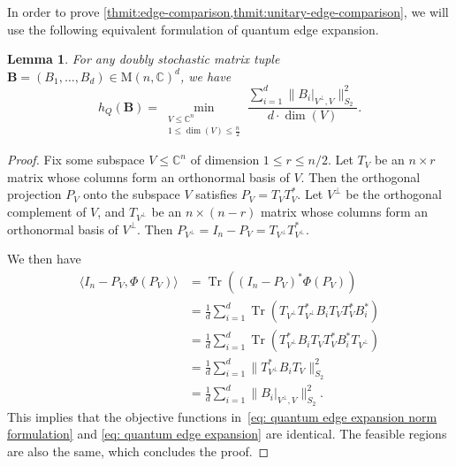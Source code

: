 \documentclass[11pt]{article}
\newtheorem{lemma}[theorem]{Lemma}
\theoremstyle{plain}
\numberwithin{equation}{section}
\theoremstyle{definition}
\newcommand{\bC}{\mathbb{C}}
\DeclareMathOperator{\trace}{Tr}
\newcommand{\norm}[1]{\lVert#1\rVert}
\newcommand{\M}{\mathrm{M}}
\newcommand{\tuple}[1]{\mathbf{#1}}
\newcommand{\vB}{\tuple{B}}
\begin{document}
In order to prove \cref{thmit:edge-comparison,thmit:unitary-edge-comparison}, we will use the following equivalent formulation of quantum edge expansion.
\begin{lemma}\label{lem: quantum edge expansion norm formulation}
  For any doubly stochastic matrix tuple $\vB=(B_1,\dots,B_d) \in \M(n,\bC)^d$, we have
  \begin{equation}\label{eq: quantum edge expansion norm formulation}
    h_Q(\vB)=\min_{\substack{V \leq \bC^n\\1\leq\dim(V)\leq\frac{n}{2}}}\frac{\sum_{i=1}^d\norm{B_i|_{V^\perp,V}}_{S_2}^2}{d\cdot\dim(V)}.
  \end{equation}
\end{lemma}
\begin{proof}
  Fix some subspace $V \leq \bC^n$ of dimension $1 \leq r \leq n/2$.
  Let $T_V$ be an $n\times r$ matrix whose columns form an 
  orthonormal basis of $V$. Then the orthogonal projection $P_V$ onto the subspace $V$ satisfies $P_V=T_V T^*_V$. 
    Let 
  $V^\perp$ be the orthogonal complement of $V$, and $T_{V^\perp}$ be an 
  $n\times (n-r)$ matrix whose columns form an orthonormal basis of $V^\perp$. Then 
  $P_{V^\perp}=I_n-P_V=T_{V^\perp}T_{V^\perp}^*$.
  
  We then have 
  \[
  \begin{split}
    \langle I_n-P_V,\Phi(P_V)\rangle&=\trace((I_n-P_V)^*\Phi(P_V))\\
    &=\frac 1d\sum_{i=1}^d\trace\left(T_{V^\perp}
                T_{V^\perp}^* B_iT_VT^*_VB_i^*\right)\\
    &=\frac 1d \sum_{i=1}^d\trace\left(T_{V^\perp}^*B_iT_VT^*_VB_i^*T_{V^\perp}\right)\\
    &=\frac 1d\sum_{i=1}^d\norm{T_{V^\perp}^*B_iT_V}_{S_2}^2\\
        &=\frac 1d\sum_{i=1}^d\norm{B_i|_{V^\perp, V}}_{S_2}^2.
  \end{split}
  \]
  This implies that the objective functions in~\eqref{eq: quantum edge expansion norm formulation} and \eqref{eq: quantum edge expansion} are identical. The feasible regions are also the same, which concludes the proof.
\end{proof}
\end{document}
